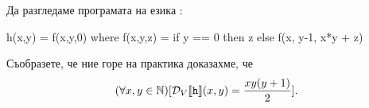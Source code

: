   

\begin{remark}
Да разгледаме програмата на езика \REC:

\begin{haskellcode}
h(x,y) = f(x,y,0) where
  f(x,y,z) = if y == 0 then z
               else f(x, y-1, x*y + z)
\end{haskellcode}

Съобразете, че ние горе на практика доказахме, че
\[(\forall x,y \in \mathbb{N})[\mathcal{D}_V\llbracket{\texttt{h}}\rrbracket(x,y) = \frac{xy(y+1)}{2}].\]
\end{remark}





